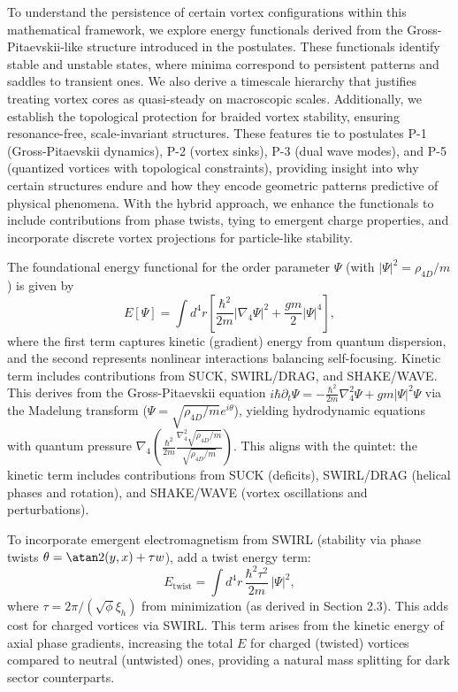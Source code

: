 To understand the persistence of certain vortex configurations within this mathematical framework, we explore energy functionals derived from the Gross-Pitaevskii-like structure introduced in the postulates. These functionals identify stable and unstable states, where minima correspond to persistent patterns and saddles to transient ones. We also derive a timescale hierarchy that justifies treating vortex cores as quasi-steady on macroscopic scales. Additionally, we establish the topological protection for braided vortex stability, ensuring resonance-free, scale-invariant structures. These features tie to postulates P-1 (Gross-Pitaevskii dynamics), P-2 (vortex sinks), P-3 (dual wave modes), and P-5 (quantized vortices with topological constraints), providing insight into why certain structures endure and how they encode geometric patterns predictive of physical phenomena. With the hybrid approach, we enhance the functionals to include contributions from phase twists, tying to emergent charge properties, and incorporate discrete vortex projections for particle-like stability.

The foundational energy functional for the order parameter $\Psi$ (with $|\Psi|^2 = \rho_{4D}/m$) is given by
\begin{equation}
E[\Psi] = \int d^4 r \left[ \frac{\hbar^2}{2m} |\nabla_4 \Psi|^2 + \frac{g m}{2} |\Psi|^4 \right],
\end{equation}
where the first term captures kinetic (gradient) energy from quantum dispersion, and the second represents nonlinear interactions balancing self-focusing. Kinetic term includes contributions from SUCK, SWIRL/DRAG, and SHAKE/WAVE. This derives from the Gross-Pitaevskii equation $i \hbar \partial_t \Psi = -\frac{\hbar^2}{2 m} \nabla_4^2 \Psi + g m |\Psi|^2 \Psi$ via the Madelung transform ($\Psi = \sqrt{\rho_{4D}/m} e^{i \theta}$), yielding hydrodynamic equations with quantum pressure $\nabla_4 \left( \frac{\hbar^2}{2 m} \frac{\nabla_4^2 \sqrt{\rho_{4D}/m}}{\sqrt{\rho_{4D}/m}} \right)$. This aligns with the quintet: the kinetic term includes contributions from SUCK (deficits), SWIRL/DRAG (helical phases and rotation), and SHAKE/WAVE (vortex oscillations and perturbations).

To incorporate emergent electromagnetism from SWIRL (stability via phase twists $\theta = \atan2(y, x) + \tau w$), add a twist energy term:
\begin{equation}
E_{\text{twist}} = \int d^4 r \, \frac{\hbar^2 \tau^2}{2m} \, |\Psi|^2,
\end{equation}
where $\tau = 2\pi / (\sqrt{\phi} \xi_h)$ from minimization (as derived in Section 2.3). This adds cost for charged vortices via SWIRL. This term arises from the kinetic energy of axial phase gradients, increasing the total $E$ for charged (twisted) vortices compared to neutral (untwisted) ones, providing a natural mass splitting for dark sector counterparts.

